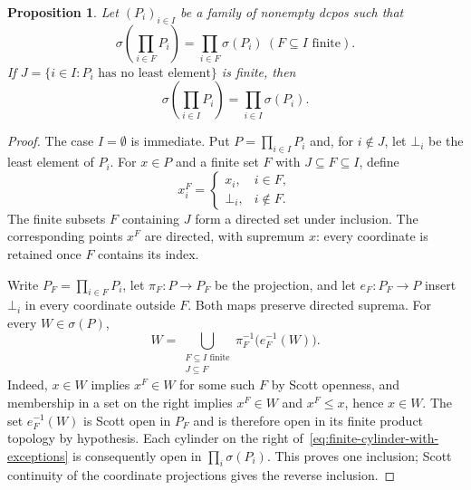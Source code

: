 \documentclass[11pt,reqno]{amsart}
\newtheorem{proposition}[theorem]{Proposition}
\theoremstyle{definition}
\theoremstyle{remark}
\numberwithin{equation}{section}
\newcommand{\Sc}{\sigma}
\begin{document}
\begin{proposition}\label{prop:finite-support-transfer}
Let $(P_i)_{i\in I}$ be a family of nonempty dcpos such that
\[
 \Sc\!\left(\prod_{i\in F}P_i\right)
 =\prod_{i\in F}\Sc(P_i)
 ~(F\subseteq I\text{ finite}).
\]
If $J=\{i\in I:P_i\text{ has no least element}\}$ is finite, then
\[
 \Sc\!\left(\prod_{i\in I}P_i\right)
 =\prod_{i\in I}\Sc(P_i).
\]
\end{proposition}
\begin{proof}
The case $I=\emptyset$ is immediate. Put $P=\prod_{i\in I}P_i$ and, for $i\notin J$, let $\bot_i$ be the least element of $P_i$. For $x\in P$ and a finite set $F$ with $J\subseteq F\subseteq I$, define
\begin{equation}\label{eq:finite-support-with-exceptions}
 x_i^F=
 \begin{cases}
  x_i,&i\in F,\\
  \bot_i,&i\notin F.
 \end{cases}
\end{equation}
The finite subsets $F$ containing $J$ form a directed set under inclusion. The corresponding points $x^F$ are directed, with supremum $x$: every coordinate is retained once $F$ contains its index.

Write $P_F=\prod_{i\in F}P_i$, let $\pi_F:P\to P_F$ be the projection, and let $e_F:P_F\to P$ insert $\bot_i$ in every coordinate outside $F$. Both maps preserve directed suprema. For every $W\in\Sc(P)$,
\begin{equation}\label{eq:finite-cylinder-with-exceptions}
 W=\bigcup_{\substack{F\subseteq I\text{ finite}\\J\subseteq F}}
       \pi_F^{-1}\bigl(e_F^{-1}(W)\bigr).
\end{equation}
Indeed, $x\in W$ implies $x^F\in W$ for some such $F$ by Scott openness, and membership in a set on the right implies $x^F\in W$ and $x^F\le x$, hence $x\in W$. The set $e_F^{-1}(W)$ is Scott open in $P_F$ and is therefore open in its finite product topology by hypothesis. Each cylinder on the right of~\eqref{eq:finite-cylinder-with-exceptions} is consequently open in $\prod_i\Sc(P_i)$. This proves one inclusion; Scott continuity of the coordinate projections gives the reverse inclusion.
\end{proof}
\end{document}

